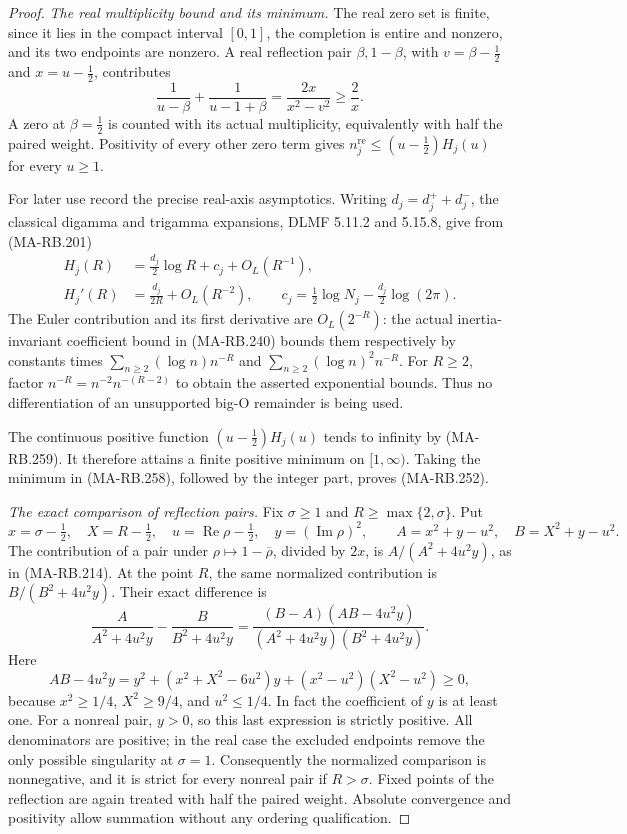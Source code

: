 \begin{proof}
\emph{The real multiplicity bound and its minimum.}
The real zero set is finite, since it lies in the compact
interval \([0,1]\), the completion is entire and nonzero,
and its two endpoints are nonzero. A real reflection pair
\(\beta,1-\beta\), with
\(v=\beta-\tfrac12\) and \(x=u-\tfrac12\), contributes
\[
 \frac1{u-\beta}+\frac1{u-1+\beta}
        =\frac{2x}{x^2-v^2}\ge\frac2x.
 \tag{MA-RB.258}
\]
A zero at \(\beta=\tfrac12\) is counted with its actual
multiplicity, equivalently with half the paired weight.
Positivity of every other zero term gives
\(n_j^{\mathrm{re}}\le(u-\tfrac12)H_j(u)\) for every
\(u\ge1\).

For later use record the precise real-axis asymptotics.
Writing \(d_j=d_j^++d_j^-\), the classical digamma and
trigamma expansions, DLMF 5.11.2 and 5.15.8, give from
(MA-RB.201)
\[
 \begin{aligned}
 H_j(R)&=\frac{d_j}{2}\log R+c_j+O_L(R^{-1}),\\
 H_j'(R)&=\frac{d_j}{2R}+O_L(R^{-2}),\qquad
 c_j=\frac12\log N_j-\frac{d_j}{2}\log(2\pi).
 \end{aligned}
 \tag{MA-RB.259}
\]
The Euler contribution and its first derivative are
\(O_L(2^{-R})\): the actual inertia-invariant coefficient
bound in (MA-RB.240) bounds them respectively by constants
times \(\sum_{n\ge2}(\log n)n^{-R}\) and
\(\sum_{n\ge2}(\log n)^2n^{-R}\). For \(R\ge2\),
factor \(n^{-R}=n^{-2}n^{-(R-2)}\) to obtain the asserted
exponential bounds. Thus no differentiation of an unsupported
big-O remainder is being used.

The continuous positive function
\((u-\tfrac12)H_j(u)\) tends to infinity by (MA-RB.259).
It therefore attains a finite positive minimum on
\([1,\infty)\). Taking the minimum in (MA-RB.258), followed
by the integer part, proves (MA-RB.252).

\emph{The exact comparison of reflection pairs.}
Fix \(\sigma\ge1\) and \(R\ge\max\{2,\sigma\}\).
Put
\[
 x=\sigma-\tfrac12,\quad X=R-\tfrac12,\quad
 u=\operatorname{Re}\rho-\tfrac12,\quad
 y=(\operatorname{Im}\rho)^2,
 \qquad A=x^2+y-u^2,\quad B=X^2+y-u^2.
 \tag{MA-RB.260}
\]
The contribution of a pair under
\(\rho\mapsto1-\overline\rho\), divided by \(2x\),
is \(A/(A^2+4u^2y)\), as in (MA-RB.214).
At the point \(R\), the same normalized contribution
is \(B/(B^2+4u^2y)\). Their exact difference is
\[
 \frac{A}{A^2+4u^2y}-\frac{B}{B^2+4u^2y}
   =\frac{(B-A)(AB-4u^2y)}
          {(A^2+4u^2y)(B^2+4u^2y)}.
 \tag{MA-RB.261}
\]
Here
\[
 AB-4u^2y
   =y^2+(x^2+X^2-6u^2)y
                     +(x^2-u^2)(X^2-u^2)\ge0,
 \tag{MA-RB.262}
\]
because \(x^2\ge1/4\), \(X^2\ge9/4\), and
\(u^2\le1/4\). In fact the coefficient of \(y\)
is at least one. For a nonreal pair, \(y>0\), so this
last expression is strictly positive. All denominators
are positive; in the real case the excluded endpoints
remove the only possible singularity at \(\sigma=1\).
Consequently the normalized comparison is nonnegative,
and it is strict for every nonreal pair if \(R>\sigma\).
Fixed points of the reflection are again treated with
half the paired weight. Absolute convergence and positivity
allow summation without any ordering qualification.


\end{proof}
